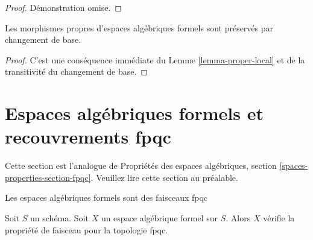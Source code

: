 \begin{proof}
Démonstration omise.
\end{proof}

\begin{lemma}
\label{lemma-base-change-proper}
Les morphismes propres d'espaces algébriques formels sont préservés par changement de base.
\end{lemma}

\begin{proof}
C'est une conséquence immédiate du Lemme \ref{lemma-proper-local}
et de la transitivité du changement de base.
\end{proof}







\section{Espaces algébriques formels et recouvrements fpqc}
\label{section-fpqc}

\noindent
Cette section est l'analogue de Propriétés des espaces algébriques, section
\ref{spaces-properties-section-fpqc}. Veuillez lire cette section
au préalable.

\begin{lemma}
\label{lemma-sheaf-fpqc}
\begin{slogan}
Les espaces algébriques formels sont des faisceaux fpqc
\end{slogan}
Soit $S$ un schéma. Soit $X$ un espace algébrique formel sur $S$. Alors
$X$ vérifie la propriété de faisceau pour la topologie fpqc.
\end{lemma}

